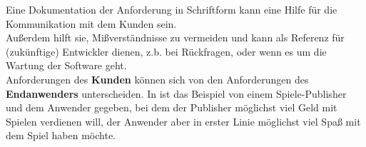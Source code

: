\noindent
Eine Dokumentation der Anforderung in Schriftform kann eine Hilfe für die Kommunikation mit dem Kunden sein.\\
Außerdem hilft sie, Mißverständnisse zu vermeiden und kann als Referenz für (zukünftige) Entwickler dienen, z.b. bei Rückfragen, oder wenn es um die Wartung der Software geht.\\

\noindent
Anforderungen des \textbf{Kunden} können sich von den Anforderungen des \textbf{Endanwenders} unterscheiden.
In \cite[41]{Wed09} ist das Beispiel von einem Spiele-Publisher und dem Anwender gegeben, bei dem der Publisher möglichst viel Geld mit Spielen verdienen will, der Anwender aber in erster Linie möglichst viel Spaß mit dem Spiel haben möchte.
